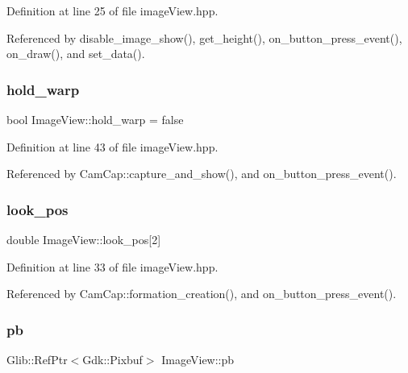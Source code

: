 Definition at line 25 of file image\+View.\+hpp.



Referenced by disable\+\_\+image\+\_\+show(), get\+\_\+height(), on\+\_\+button\+\_\+press\+\_\+event(), on\+\_\+draw(), and set\+\_\+data().

\mbox{\label{class_image_view_a93112870dda714b0bbe59b8f6cfe4b99}} 
\subsubsection{\texorpdfstring{hold\+\_\+warp}{hold\_warp}}
{\footnotesize\ttfamily bool Image\+View\+::hold\+\_\+warp = false}



Definition at line 43 of file image\+View.\+hpp.



Referenced by Cam\+Cap\+::capture\+\_\+and\+\_\+show(), and on\+\_\+button\+\_\+press\+\_\+event().

\mbox{\label{class_image_view_af6562e3dfd03c0fb66826a7a5bd6e759}} 
\subsubsection{\texorpdfstring{look\+\_\+pos}{look\_pos}}
{\footnotesize\ttfamily double Image\+View\+::look\+\_\+pos\mbox{[}2\mbox{]}}



Definition at line 33 of file image\+View.\+hpp.



Referenced by Cam\+Cap\+::formation\+\_\+creation(), and on\+\_\+button\+\_\+press\+\_\+event().

\mbox{\label{class_image_view_aad080a9649488e9141f2ce0256dd4035}} 
\subsubsection{\texorpdfstring{pb}{pb}}
{\footnotesize\ttfamily Glib\+::\+Ref\+Ptr$<$Gdk\+::\+Pixbuf$>$ Image\+View\+::pb\hspace{0.3cm}{\ttfamily [private]}}



